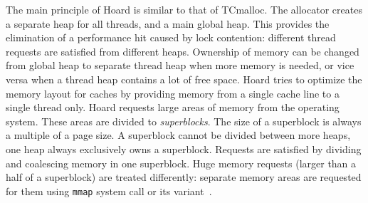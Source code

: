 The main principle of Hoard is similar to that of TCmalloc. The allocator
creates a separate heap for all threads, and a main global heap. This provides
the elimination of a performance hit caused by lock contention: different thread
requests are satisfied from different heaps. Ownership of memory can be changed
from global heap to separate thread heap when more memory is needed, or vice
versa when a thread heap contains a lot of free space. Hoard tries to optimize
the memory layout for caches by providing memory from a single cache line to a 
single thread only. Hoard requests large areas of memory from the operating
system. These areas are divided to {\em superblocks}. The size of a superblock
is always a multiple of a page size. A superblock cannot be divided between more
heaps, one heap always exclusively owns a superblock. Requests are satisfied by
dividing and coalescing memory in one superblock. Huge memory requests (larger
than a half of a superblock) are treated differently: separate memory areas are
requested for them using {\tt mmap} system call or its variant~\cite{hoard}.







